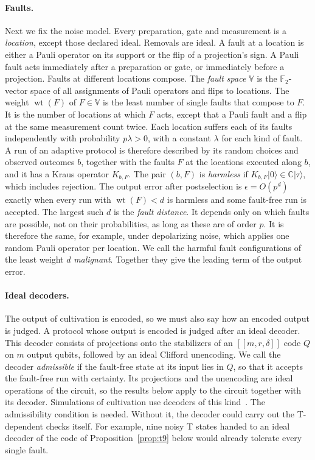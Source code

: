 \documentclass[aps,prl,reprint,twocolumn,amsmath,amssymb,floatfix,nofootinbib,superscriptaddress]{revtex4-2}
\theoremstyle{definition}
\theoremstyle{remark}
\newcommand{\F}{\mathbb F_2}
\newcommand{\wt}{\operatorname{wt}}
\newcommand{\fs}{\mathbb V}
\begin{document}
\paragraph*{Faults.}
Next we fix the noise model. Every preparation, gate and measurement is a \emph{location}, except those declared ideal. Removals are ideal. A fault at a location is either a Pauli operator on its support or the flip of a projection's sign. A Pauli fault acts immediately after a preparation or gate, or immediately before a projection. Faults at different locations compose. The \emph{fault space} $\fs$ is the $\F$-vector space of all assignments of Pauli operators and flips to locations. The weight $\wt(F)$ of $F\in\fs$ is the least number of single faults that compose to $F$. It is the number of locations at which $F$ acts, except that a Pauli fault and a flip at the same measurement count twice. Each location suffers each of its faults independently with probability $p\lambda>0$, with a constant $\lambda$ for each kind of fault. A run of an adaptive protocol is therefore described by its random choices and observed outcomes $b$, together with the faults $F$ at the locations executed along $b$, and it has a Kraus operator $K_{b,F}$. The pair $(b,F)$ is \emph{harmless} if $K_{b,F}|0\rangle\in\mathbb C|\tau\rangle$, which includes rejection. The output error after postselection is $\epsilon=O(p^d)$ exactly when every run with $\wt(F)<d$ is harmless and some fault-free run is accepted. The largest such $d$ is the \emph{fault distance}. It depends only on which faults are possible, not on their probabilities, as long as these are of order $p$. It is therefore the same, for example, under depolarizing noise, which applies one random Pauli operator per location. We call the harmful fault configurations of the least weight $d$ \emph{malignant}. Together they give the leading term of the output error.

\paragraph*{Ideal decoders.}
The output of cultivation is encoded, so we must also say how an encoded output is judged. A protocol whose output is encoded is judged after an ideal decoder. This decoder consists of projections onto the stabilizers of an $[[m,r,\delta]]$ code $Q$ on $m$ output qubits, followed by an ideal Clifford unencoding. We call the decoder \emph{admissible} if the fault-free state at its input lies in $Q$, so that it accepts the fault-free run with certainty. Its projections and the unencoding are ideal operations of the circuit, so the results below apply to the circuit together with its decoder. Simulations of cultivation use decoders of this kind~\cite{cultivation}. The admissibility condition is needed. Without it, the decoder could carry out the T-dependent checks itself. For example, nine noisy T states handed to an ideal decoder of the code of Proposition~\ref{prop:t9} below would already tolerate every single fault.
\end{document}
